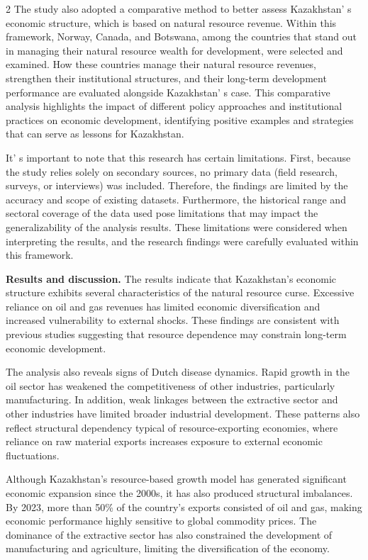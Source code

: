 \begin{multicols}{2}
The study also adopted a comparative method to better assess
Kazakhstan' s economic structure, which is based on
natural resource revenue. Within this framework, Norway, Canada, and
Botswana, among the countries that stand out in managing their natural
resource wealth for development, were selected and examined. How these
countries manage their natural resource revenues, strengthen their
institutional structures, and their long-term development performance
are evaluated alongside Kazakhstan' s case. This
comparative analysis highlights the impact of different policy
approaches and institutional practices on economic development,
identifying positive examples and strategies that can serve as lessons
for Kazakhstan.

It' s important to note that this research has certain
limitations. First, because the study relies solely on secondary
sources, no primary data (field research, surveys, or interviews) was
included. Therefore, the findings are limited by the accuracy and scope
of existing datasets. Furthermore, the historical range and sectoral
coverage of the data used pose limitations that may impact the
generalizability of the analysis results. These limitations were
considered when interpreting the results, and the research findings were
carefully evaluated within this framework.

{\bfseries Results and discussion.} The results indicate that Kazakhstan's
economic structure exhibits several characteristics of the natural
resource curse. Excessive reliance on oil and gas revenues has limited
economic diversification and increased vulnerability to external shocks.
These findings are consistent with previous studies suggesting that
resource dependence may constrain long-term economic development.

The analysis also reveals signs of Dutch disease dynamics. Rapid growth
in the oil sector has weakened the competitiveness of other industries,
particularly manufacturing. In addition, weak linkages between the
extractive sector and other industries have limited broader industrial
development. These patterns also reflect structural dependency typical
of resource-exporting economies, where reliance on raw material exports
increases exposure to external economic fluctuations.

Although Kazakhstan's resource-based growth model has generated
significant economic expansion since the 2000s, it has also produced
structural imbalances. By 2023, more than 50\% of the country's exports
consisted of oil and gas, making economic performance highly sensitive
to global commodity prices. The dominance of the extractive sector has
also constrained the development of manufacturing and agriculture,
limiting the diversification of the economy.


\end{multicols}

